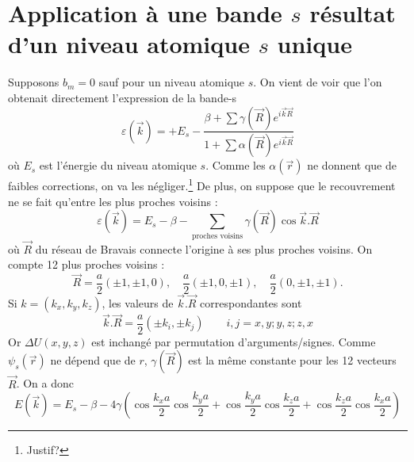 \section{Application à une bande $s$ résultat d'un niveau atomique $s$ unique}
Supposons $b_m=0$ sauf pour un niveau atomique $s$. On vient de voir que l'on 
obtenait directement l'expression de la bande-s 
\begin{equation}
\varepsilon(\vec{k}) = +E_s-\dfrac{\beta+\sum \gamma(\vec{R})e^{i\vec{k}\vec{R}}}{
1+\sum \alpha(\vec{R})e^{i\vec{k}\vec{R}}}
\end{equation}
où $E_s$ est l'énergie du niveau atomique $s$. Comme les $\alpha(\vec{r})$ ne 
donnent que de faibles corrections, on va les négliger.\footnote{Justif?} De plus, 
on suppose que le recouvrement ne se fait qu'entre les plus proches voisins : 
\begin{equation}
\varepsilon(\vec{k}) = E_s-\beta -\sum_{\text{proches \ voisins}} \gamma(\vec{R})
\cos\vec{k}.\vec{R}
\end{equation}
où $\vec{R}$ du réseau de Bravais connecte l'origine à ses plus proches voisins. 
On compte 12 plus proches voisins :
\begin{equation}
\vec{R} = \dfrac{a}{2}(\pm1,\pm1,0),\quad \frac{a}{2}(\pm1,0,\pm1),\quad \frac{a}{2}
(0,\pm1,\pm1).
\end{equation}
Si $k=(k_x,k_y,k_z)$, les valeurs de $\vec{k}.\vec{R}$ correspondantes sont
\begin{equation}
\vec{k}.\vec{R} = \frac{a}{2}(\pm k_i,\pm k_j)\qquad i,j = x,y;y,z;z,x
\end{equation}
Or $\Delta U(x,y,z)$ est inchangé par permutation d'arguments/signes. Comme 
$\psi_s(\vec{r})$ ne dépend que de $r$, $\gamma(\vec{R})$ est la même constante 
pour les 12 vecteurs $\vec{R}$. On a donc
\begin{equation}
E(\vec{k}) = E_s-\beta-4\gamma\left(\cos\frac{k_xa}{2}\cos\frac{k_ya}{2}+
\cos\frac{k_ya}{2}\cos\frac{k_za}{2}+\cos\frac{k_za}{2}\cos\frac{k_xa}{2}\right)
\end{equation}



















